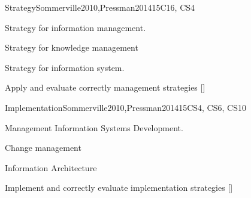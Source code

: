 \begin{syllabus}
\begin{unit}{Strategy}{}{Sommerville2010,Pressman2014}{15}{C16, CS4}
\begin{topics}
    \item Strategy for information management.
    \item Strategy for knowledge management
    \item Strategy for information system.
\end{topics}
\begin{learningoutcomes}
    \item Apply and evaluate correctly management strategies [\Assessment]
\end{learningoutcomes}
\end{unit}

\begin{unit}{Implementation}{}{Sommerville2010,Pressman2014}{15}{CS4, CS6, CS10}
\begin{topics}
    \item Management Information Systems Development.
    \item Change management
    \item Information Architecture
\end{topics}
\begin{learningoutcomes}
    \item Implement and correctly evaluate implementation strategies [\Assessment]
\end{learningoutcomes}
\end{unit}

\begin{coursebibliography}
\end{coursebibliography}

\end{syllabus}
